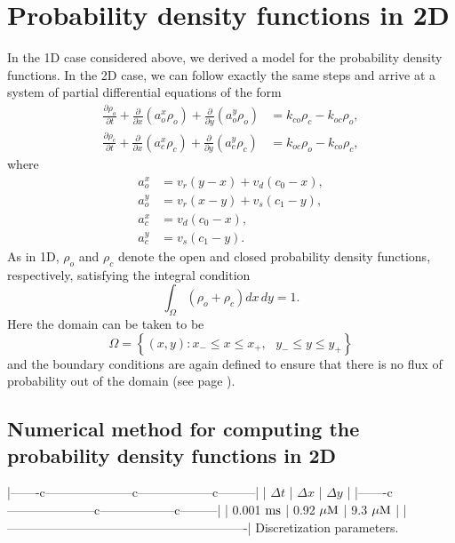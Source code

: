 
\section{Probability density functions in 2D}

In the 1D case considered above, we derived a model for the probability
density functions. In the 2D case, we can follow exactly the same steps and
arrive at a system of partial differential equations of the form
\begin{align}
\frac{\partial\rho_{o}}{\partial t}+\frac{\partial}{\partial x}\left(
a_{o}^{x}\rho_{o}\right)  +\frac{\partial}{\partial y}\left(  a_{o}^{y}
\rho_{o}\right)   &  =k_{co}\rho_{c}-k_{oc}\rho_{o},\label{eq:pdf21}\\
\frac{\partial\rho_{c}}{\partial t}+\frac{\partial}{\partial x}\left(
a_{c}^{x}\rho_{c}\right)  +\frac{\partial}{\partial y}\left(  a_{c}^{y}
\rho_{c}\right)   &  =k_{oc}\rho_{o}-k_{co}\rho_{c},\label{eq:pdf22}
\end{align}
where 
\begin{align}
a_{o}^{x} &  =v_{r}\left(  y-x\right)  +v_{d}\left(  c_{0}-x\right)
,\nonumber\\
a_{o}^{y} &  =v_{r}\left(  x-y\right)  +v_{s}\left(  c_{1}-y\right)
,\label{eq:fluxes2D2}\\
a_{c}^{x} &  =v_{d}\left(  c_{0}-x\right)  ,\nonumber\\
a_{c}^{y} &  =v_{s}\left(  c_{1}-y\right)  .\nonumber
\end{align}
As in 1D, $\rho_{o}$ and $\rho_{c}$ denote the open and closed probability
density functions, respectively, satisfying the integral condition
\begin{equation}
\int_{\Omega}\left(  \rho_{o}+\rho_c\right)  dx\, dy=1. \label{int10000}
\end{equation}
Here the domain can be taken to be
\begin{equation}
\Omega=\left\{  (x,y):x_{-}\leqslant x\leqslant x_{+},\text{ }y_{-}\leqslant
y\leqslant y_{+}\right\}
\end{equation}
and the boundary conditions are again defined to ensure that there is
no flux of probability out of the domain (see page \pageref{bc}).

\subsection{Numerical method for computing the probability density functions in 2D}
\label{numethodprob}
|-------c---------------------c------------------c---------|
| $\Delta t$       | $\Delta x$         | $\Delta y$       |
|-------c---------------------c------------------c---------|
|  0.001 $\rm{ms}$ |  0.92 $\rm{\mu M}$ | 9.3 $\rm{\mu M}$ |
|----------------------------------------------------------|
Discretization parameters.

